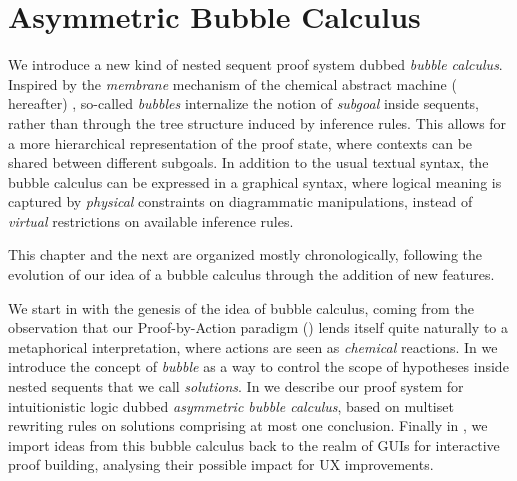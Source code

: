 \setchapterpreamble[u]{\margintoc}
\chapter{Asymmetric Bubble Calculus}

We introduce a new kind of nested sequent proof system dubbed \emph{bubble
calculus}. Inspired by the \emph{membrane} mechanism of the chemical abstract
machine ({\cham} hereafter) , so-called
\emph{bubbles} internalize the notion of \emph{subgoal} inside sequents, rather
than through the tree structure induced by inference rules. This allows for a
more hierarchical representation of the proof state, where contexts can be
shared between different subgoals. In addition to the usual textual syntax, the
bubble calculus can be expressed in a graphical syntax, where logical meaning is
captured by \emph{physical} constraints on diagrammatic manipulations, instead
of \emph{virtual} restrictions on available inference rules.


This chapter and the next are organized mostly chronologically, following the
evolution of our idea of a bubble calculus through the addition of new features.

We start in  with the genesis of the idea of bubble calculus,
coming from the observation that our Proof-by-Action paradigm ()
lends itself quite naturally to a metaphorical interpretation, where actions are
seen as \emph{chemical} reactions. In  we introduce the concept
of \emph{bubble} as a way to control the scope of hypotheses inside nested
sequents that we call \emph{solutions}. In  we describe our
proof system for intuitionistic logic dubbed \emph{asymmetric bubble calculus},
based on multiset rewriting rules on solutions comprising at most one
conclusion. Finally in , we import ideas from this bubble
calculus back to the realm of GUIs for interactive proof building, analysing
their possible impact for UX improvements.


